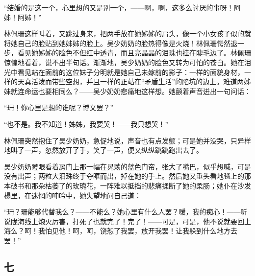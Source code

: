 \par “结婚的是这一个，心里想的又是别一个，——啊，啊，这多么讨厌的事呀！阿姊！阿姊！”
\par 林佩珊这样叫着，又跳过身来，把两手放在她姊姊的肩头，像一个小女孩子似的就将她自己的脸贴到她姊姊的脸上。吴少奶奶的脸热得像是火烧！林佩珊愕然退一步，看见她姊姊的脸色不但红中透青，而且亮晶晶的泪珠也挂在睫毛边了。林佩珊惊惶地看着，说不出半句话。渐渐地，吴少奶奶的脸色又转为可怕的苍白。她在泪光中看见站在面前的这位妹子分明就是她自己未嫁前的影子：一样的面貌身材，一样的天真活泼而带些空想，并且一样的正站在“矛盾生活”的陷坑的边上。难道两姊妹就连命运也要相同么？——吴少奶奶悲痛地这样想。她颤着声音迸出一句问话：
\par “珊！你心里是想的谁呢？博文罢？”
\par “也不是。我不知道！姊姊，我要哭！——我只想哭！”
\par 林佩珊突然抱住了吴少奶奶，急促地说，声音也有点发颤；可是她并没哭，只异样地叫了一声，忽然放开了手，笑了一声，便又纵纵跳跳跑出去了。
\par 吴少奶奶瞪眼看着房门上那一幅在晃荡的蓝色门帘，张大了嘴巴，似乎想喊，可是没有出声；两粒大泪珠终于夺眶而出，掉在她的手上。然后她又垂头看地毯上的那本破书和那朵枯萎了的玫瑰花，一阵难以抵挡的悲痛揉断了她的柔肠；她仆在沙发榻里，在迷惘的呻吟中，她失望地问自己道：
\par “珊？珊能够代替我么？——不能么？她心里有什么人罢？嗳，我的痴心！——听说陇海线上炮火厉害，打死了也就完了！完了！——可是，可是，他不说就要回上海么？呵！我怕见他！呵，呵，饶恕了我罢，放开我罢！让我躲到什么地方去罢！”



\subsection*{七}

